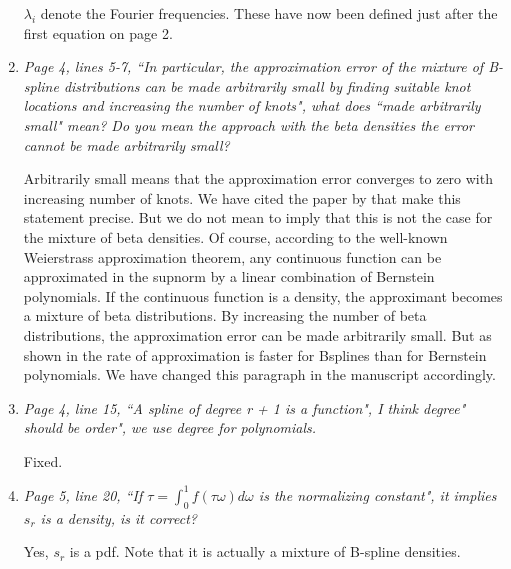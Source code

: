 \documentclass{scrartcl}
\newcommand{\refereeQuote}{\textit }
\newcommand{\response}{}
\begin{document}
\begin{enumerate}
	\response{$\lambda_i$ denote the Fourier frequencies. These have now been defined just after the first equation on page 2.} \bigskip
	
	\item \refereeQuote{ Page 4, lines 5-7, ``In particular, the approximation error of the mixture of B-spline distributions can be made arbitrarily small by finding suitable knot locations and increasing the number of knots", what does ``made arbitrarily small" mean? Do you mean the approach with the beta densities the error cannot be made arbitrarily small?}\smallskip
	
	\response{Arbitrarily small means that the approximation error converges to zero with increasing number of knots. We have  cited the paper by \cite{Perron:2001} that make this statement precise. But we do not mean to imply that this is not the case for the mixture of beta densities. Of course, according to the well-known Weierstrass approximation theorem, any continuous function can be approximated in the supnorm by a linear combination of Bernstein polynomials. If the continuous function is a density, the approximant becomes a mixture of beta distributions. By increasing the number of beta distributions, the approximation error can be made arbitrarily small. But as shown in \cite{Perron:2001} the rate of approximation is faster for Bsplines than for Bernstein polynomials. We have changed this paragraph in the manuscript accordingly.}

	
	\item \refereeQuote{Page 4, line 15, ``A spline of degree r + 1 is a function", I think degree" should be order", we use degree for polynomials.}\smallskip
	
	\response{Fixed.} \bigskip	
	
	\item \refereeQuote{Page 5, line 20, ``If $\tau = \int_0^1f(\tau \omega)d \omega$ is the normalizing constant", it implies $s_r$ is a density, is it correct?}
	
	\response{Yes, $s_r$ is a pdf.  Note that it is actually a mixture of B-spline densities.}
\end{enumerate}
\end{document}
